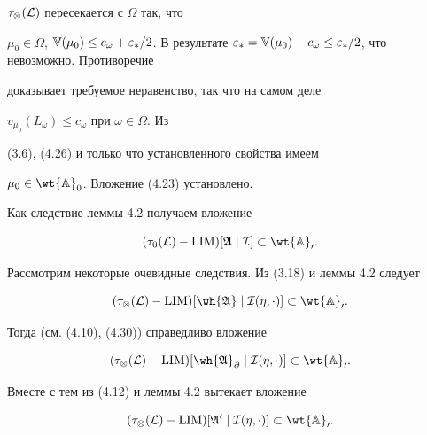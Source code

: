 \begin{pf}
$\tau_\otimes(\cal L)$ пересекается с $\Omega$ так, что


$\mu_0\in\Omega$, $\Bbb V(\mu_0)\le c_\omega+


\varepsilon_*/2$. В результате $\varepsilon_*=\Bbb V(\mu_0)


-c_\omega\le\varepsilon_*/2$, что невозможно. Противоречие


доказывает требуемое неравенство, так что на самом деле


$v_{\mu_0}(L_\omega)\le c_\omega$ при $\omega\in\Omega$. Из


(3.6), (4.26) и только что установленного свойства имеем


$\mu_0\in\wt{\Bbb A}_0$. Вложение (4.23) установлено.


\end{pf}





Как следствие леммы 4.2 получаем вложение


\begin{equation}


(\tau_0(\cal L)-\LIM)[\frak A\mid\cal I]\subset\wt{\Bbb A}_0.


\end{equation}


Рассмотрим некоторые очевидные следствия. Из (3.18) и леммы 4.2 следует


\begin{equation}


(\tau_\otimes(\cal L)-\LIM)[\wh{\frak A}\mid


\cal I(\eta,\cdot)]\subset\wt{\Bbb A}_0.


\end{equation}


Тогда (см. (4.10), (4.30)) справедливо вложение


\begin{equation}


(\tau_\otimes(\cal L)-\LIM)[\wh{\frak A}_\partial\mid


\cal I(\eta,\cdot)]\subset\wt{\Bbb A}_0.


\end{equation}


Вместе с тем из (4.12) и леммы 4.2 вытекает вложение


\begin{equation}


(\tau_\otimes(\cal L)-\LIM)[\frak A^0\mid


\cal I(\eta,\cdot)]\subset\wt{\Bbb A}_0.


\end{equation}


